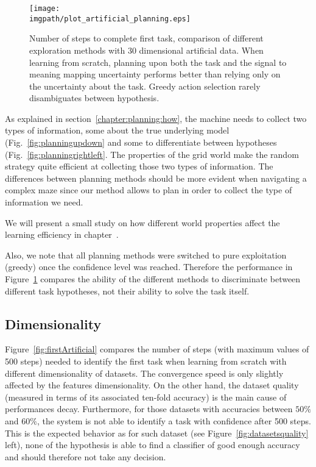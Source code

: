 \begin{figure}[!ht]
  \centering
      \texttt{[image: \\imgpath/plot\_artificial\_planning.eps]}
      \caption{Number of steps to complete first task, comparison of different exploration methods with 30 dimensional artificial data. When learning from scratch, planning upon both the task and the signal to meaning mapping uncertainty performs better than relying only on the uncertainty about the task. Greedy action selection rarely disambiguates between hypothesis.}
    \label{fig:artificialplanning}
\end{figure}

As explained in section~\ref{chapter:planning:how}, the machine needs to collect two types of information, some about the true underlying model (Fig.~\ref{fig:planningupdown} and some to differentiate between hypotheses (Fig.~\ref{fig:planningrightleft}. The properties of the grid world make the random strategy quite efficient at collecting those two types of information. The differences between planning methods should be more evident when navigating a complex maze since our method allows to plan in order to collect the type of information we need. 

We will present a small study on how different world properties affect the learning efficiency in chapter~. 

Also, we note that all planning methods were switched to pure exploitation (greedy) once the confidence level was reached. Therefore the performance in Figure~\ref{fig:artificialplanning} compares the ability of the different methods to discriminate between different task hypotheses, not their ability to solve the task itself.

\subsection{Dimensionality}

Figure~\ref{fig:firstArtificial} compares the number of steps (with maximum values of 500 steps) needed to identify the first task when learning from scratch with different dimensionality of datasets. The convergence speed is only slightly affected by the features dimensionality. On the other hand, the dataset quality (measured in terms of its associated ten-fold accuracy) is the main cause of performances decay. Furthermore, for those datasets with accuracies between $50\%$ and $60\%$, the system is not able to identify a task with confidence after 500 steps. This is the expected behavior as for such dataset (see Figure~\ref{fig:datasetsquality} left), none of the hypothesis is able to find a classifier of good enough accuracy and should therefore not take any decision.

